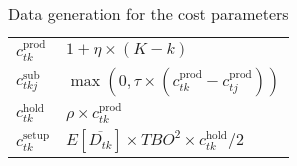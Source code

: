\documentclass[11pt]{article}
\newcommand{\ti}{t} %
\newcommand{\Ti}{T}
\newcommand{\ka}{k} %
\newcommand{\Ka}{K}
\newcommand{\jey}{j} %
\begin{document}
\begin{table}[h]
\centering
\caption{Data generation for the cost parameters }
\begin{tabular}{ll}
\toprule
$c^{\text{prod}}_{\ti \ka}$  & $1+\eta \times(\Ka-\ka)$ 
\\
$c^{\text{sub}}_{\ti \ka \jey }$  & $\max(0,\tau \times (c^{\text{prod}}_{ \ti \ka} - c^{\text{prod}}_{\ti \jey}))$ 
\\ 
$c^{\text{hold}}_{\ti \ka}$  & $\rho \times c^{\text{prod}}_{\ti \ka} $ 
\\ 
$c^{\text{setup}}_{\ti \ka}$ & $E[\overline{D_{\ti \ka}}] \times TBO^2 \times c^{\text{hold}}_{\ti \ka} /2$ \\ 
\bottomrule
\end{tabular}
 \label{tab:Sub_FD_parameters}
\end{table}








\end{document}
